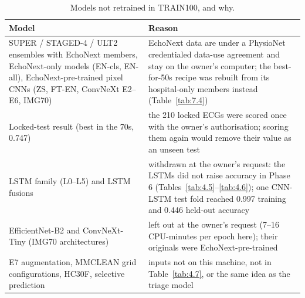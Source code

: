\begin{table}[htbp]
\caption{Models not retrained in TRAIN100, and why.}\label{tab:7.7}
\small
\begin{tabular}{>{\raggedright\arraybackslash\hspace{0pt}}p{}>{\raggedright\arraybackslash\hspace{0pt}}p{}}
\toprule
\textbf{Model} & \textbf{Reason} \\
\midrule
SUPER / STAGED-4 / ULT2 ensembles with EchoNext members, EchoNext-only models (EN-cls, EN-all), EchoNext-pre-trained pixel CNNs (ZS, FT-EN, ConvNeXt E2--E6, IMG70) & EchoNext data are under a PhysioNet credentialed data-use agreement and stay on the owner's computer; the best-for-50s recipe was rebuilt from its hospital-only members instead (Table~\ref{tab:7.4}) \\
Locked-test result (best in the 70s, 0.747) & the 210 locked ECGs were scored once with the owner's authorisation; scoring them again would remove their value as an unseen test \\
LSTM family (L0--L5) and LSTM fusions & withdrawn at the owner's request: the LSTMs did not raise accuracy in Phase 6 (Tables~\ref{tab:4.5}--\ref{tab:4.6}); one CNN-LSTM test fold reached 0.997 training and 0.446 held-out accuracy \\
EfficientNet-B2 and ConvNeXt-Tiny (IMG70 architectures) & left out at the owner's request (7--16 CPU-minutes per epoch here); their originals were EchoNext-pre-trained \\
E7 augmentation, MMCLEAN grid configurations, HC30F, selective prediction & inputs not on this machine, not in Table~\ref{tab:4.7}, or the same idea as the triage model \\
\bottomrule
\end{tabular}
\end{table}
